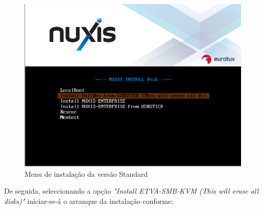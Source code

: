 \begin{figure}[H]
	\begin{center}
	\includegraphics[scale=0.4]{screenshots/install/unitbox/bootmenu.png}
	\caption{Menu de instalação da versão Standard}
	\label{fig:boot_install_screen_standard}
	\end{center}
\end{figure}

De seguida, seleccionando a opção \emph{"Install ETVA-SMB-KVM (This will erase all disks)"} iniciar-se-á o arranque da instalação conforme:

